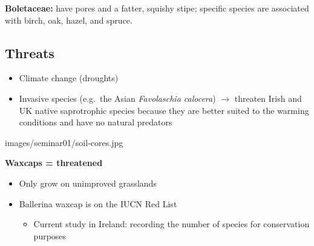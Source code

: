 \textbf{Boletaceae:} have pores and a fatter, squishy stipe; specific species are associated with birch, oak, hazel, and spruce.
\begin{imagerow}
   \hfill
   \hfill
\end{imagerow}

\subsection{Threats}

\begin{itemize}
  \item Climate change (droughts)
  \item Invasive species (e.g.\ the Asian \textit{Favolaschia calocera}) $\rightarrow$ threaten Irish and UK native saprotrophic species because they are better suited to the warming conditions and have no natural predators
\end{itemize}
\begin{imagerow}
   \hfill
\end{imagerow}

%
  {images/seminar01/soil-cores.jpg}

\textbf{Waxcaps = threatened}
\begin{itemize}
  \item Only grow on unimproved grasslands
  \item Ballerina waxcap is on the IUCN Red List
  \begin{itemize}
    \item Current study in Ireland: recording the number of species for conservation purposes
  \end{itemize}
\end{itemize}

